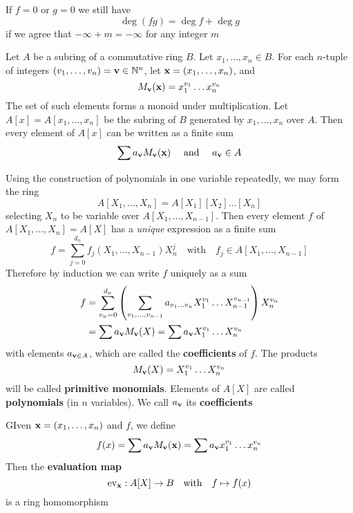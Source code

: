 \documentclass[11pt]{article}
\def \ev {\text{ev}}
\begin{document}
If \(f=0\) or \(g=0\) we still have
\begin{equation*}
\deg(fg)=\deg f+\deg g
\end{equation*}
if we agree that \(-\infty+m=-\infty\) for any integer \(m\)

Let \(A\) be a subring of a commutative ring \(B\). Let \(x_1,\dots,x_n\in B\). For each \(n\)-tuple of
integers \((v_1,\dots,v_n)=\operatorname{\textbf{v}}\in\mathbb{N}^n\), let \(\operatorname{\textbf{x}}=(x_1,\dots,x_n)\), and
\begin{equation*}
M_{\operatorname{\textbf{v}}}(\operatorname{\textbf{x}})=x_1^{v_1}\dots x_n^{v_n}
\end{equation*}
The set of such elements forms a monoid under multiplication. Let \(A[x]=A[x_1,\dots,x_n]\) be the
subring of \(B\) generated by \(x_1,\dots,x_n\) over \(A\). Then every element of \(A[x]\) can be
written as a finite sum
\begin{equation*}
\sum a_{\operatorname{\textbf{v}}}M_{\operatorname{\textbf{v}}}(\operatorname{\textbf{x}}) \quad\text{ and }\quad a_{\operatorname{\textbf{v}}}\in A
\end{equation*}

Using the construction of polynomials in one variable repeatedly, we may form the ring
\begin{equation*}
A[X_1,\dots,X_n]=A[X_1][X_2]\dots[X_n]
\end{equation*}
selecting \(X_n\) to be variable over \(A[X_1,\dots,X_{n-1}]\). Then every element \(f\)
of \(A[X_1,\dots,X_n]=A[X]\) has a \emph{unique} expression as a finite sum
\begin{equation*}
f=\sum_{j=0}^{d_n}f_j(X_1,\dots,X_{n-1})X_n^j \quad\text{with}\quad f_j\in A[X_1,\dots,X_{n-1}]
\end{equation*}
Therefore by induction we can write \(f\) uniquely as a sum
\begin{align*}
f&=\sum_{v_n=0}^{d_n}\left(
\sum_{v_1,\dots,v_{n-1}}a_{v_1\dots v_n}X_1^{v_1}\dots X_{n-1}^{v_{n-1}} \right)X^{v_n}_n\\
&=\sum a_{\operatorname{\textbf{v}}}M_{\operatorname{\textbf{v}}}(X)=\sum a_{\operatorname{\textbf{v}}}X_1^{v_1}\dots X_n^{v_n}
\end{align*}
with elements \(a_{\operatorname{\textbf{v}}\in A}\), which are called the \textbf{coefficients} of \(f\). The products
\begin{equation*}
M_{\operatorname{\textbf{v}}}(X)=X_1^{v_1}\dots X_n^{v_n}
\end{equation*}
will be called \textbf{primitive monomials}. Elements of \(A[X]\) are called \textbf{polynomials} (in \(n\)
variables). We call \(a_{\operatorname{\textbf{v}}}\) its \textbf{coefficients}

GIven \(\operatorname{\textbf{x}}=(x_1,\dots,x_n)\) and \(f\), we define
\begin{equation*}
f(x)=\sum a_{\operatorname{\textbf{v}}}M_{\operatorname{\textbf{v}}}(\operatorname{\textbf{x}})=\sum a_{\operatorname{\textbf{v}}}x_1^{v_1}\dots x_n^{v_n}
\end{equation*}
Then the \textbf{evaluation map}
\begin{equation*}
\ev_{\bx}:A[X]\to B \quad\text{with}\quad f\mapsto f(x)
\end{equation*}
is a ring homomorphism
\end{document}
